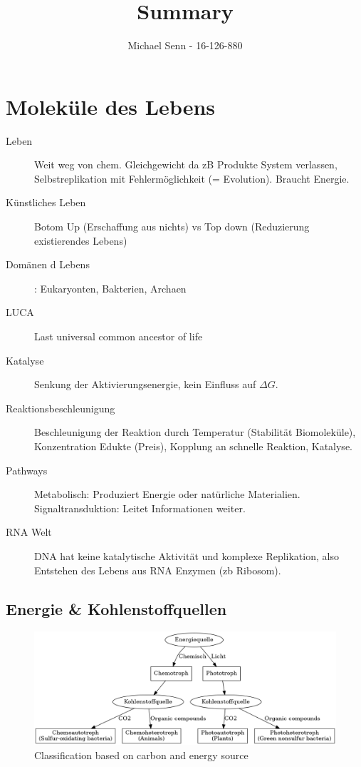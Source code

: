 \documentclass[a4paper,twocolumn,english,fontsize=7,DIV=16]{scrartcl}
\title{Summary}
\author{Michael Senn \maillink{michael.senn@students.unibe.ch} - 16-126-880}
\date{\printdate}
\begin{document}
\maketitle

\section{Moleküle des Lebens}

\begin{description}
	\item[Leben] Weit weg von chem. Gleichgewicht da zB Produkte System
		verlassen, Selbstreplikation mit Fehlermöglichkeit (=
		Evolution). Braucht Energie.
	\item[Künstliches Leben] Botom Up (Erschaffung aus nichts) vs Top down
		(Reduzierung existierendes Lebens)
	\item[Domänen d Lebens]: Eukaryonten, Bakterien, Archaen
	\item[LUCA] Last universal common ancestor of life
	\item[Katalyse] Senkung der Aktivierungsenergie, kein Einfluss auf
		$\Delta G$.
	\item[Reaktionsbeschleunigung] Beschleunigung der Reaktion durch
		Temperatur (Stabilität Biomoleküle), Konzentration Edukte
		(Preis), Kopplung an schnelle Reaktion, Katalyse.
	\item[Pathways] Metabolisch: Produziert Energie oder natürliche
		Materialien. Signaltransduktion: Leitet Informationen weiter.
	\item[RNA Welt] DNA hat keine katalytische Aktivität und komplexe
		Replikation, also Entstehen des Lebens aus RNA Enzymen (zb
		Ribosom).
\end{description}

\subsection{Energie \& Kohlenstoffquellen}

\begin{figure}[h]
	\centering
	\includegraphics[width=\linewidth]{graphs/ec_quellen.png}
	\caption{Classification based on carbon and energy source}
\end{figure}
\end{document}

